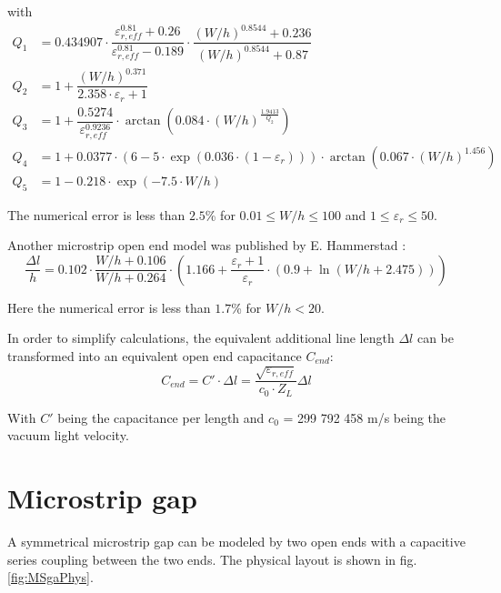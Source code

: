\documentclass[10pt]{report}
\begin{document}
with
\begin{align}
Q_1 &= 0.434907\cdot \dfrac{\varepsilon_{r,eff}^{0.81}+0.26}{\varepsilon_{r,eff}^{0.81}-0.189}\cdot
      \dfrac{\left( W/h \right)^{0.8544} + 0.236}{\left( W/h \right)^{0.8544} + 0.87}\\
Q_2 &= 1 + \dfrac{\left( W/h \right) ^{0.371}}{2.358\cdot \varepsilon_r + 1}\\
Q_3 &= 1 + \dfrac{0.5274}{\varepsilon_{r,eff}^{0.9236}} \cdot
      \arctan\left( 0.084\cdot\left( W/h \right) ^{\tfrac{1.9413}{Q_2}} \right)\\
Q_4 &= 1 + 0.0377\cdot \left( 6-5\cdot\exp{\left(0.036\cdot\left(1-\varepsilon_r\right)\right)} \right)\cdot
      \arctan\left( 0.067\cdot\left(W/h\right)^{1.456} \right)\\
Q_5 &= 1 - 0.218\cdot \exp{\left( -7.5\cdot W/h \right)}
\end{align}

The numerical error is less than $2.5$\% for $0.01\le W/h \le 100$ and
$1\le\varepsilon_r\le 50$.

\addvspace{12pt}

Another microstrip open end model was published by E. Hammerstad
\cite{Hammerstad2}:
\begin{equation}
\dfrac{\Delta l}{h} = 0.102\cdot \dfrac{W/h+0.106}{W/h+0.264} \cdot
    \left( 1.166 + \dfrac{\varepsilon_r+1}{\varepsilon_r}\cdot \left(0.9+\ln{\left(W/h+2.475\right)} \right) \right)
\end{equation}

Here the numerical error is less than $1.7$\% for $W/h < 20$.

\addvspace{12pt}

In order to simplify calculations, the equivalent additional line
length $\Delta l$ can be transformed into an equivalent open end
capacitance $C_{end}$:
\begin{equation}
\label{eq:Cend}
C_{end} = C'\cdot \Delta l = \dfrac{\sqrt{\varepsilon_{r,eff}}}{c_0\cdot Z_L} \Delta l
\end{equation}

With $C'$ being the capacitance per length and $c_0$ = 299 792 458 m/s
being the vacuum light velocity.

\section{Microstrip gap}

A symmetrical microstrip gap can be modeled by two open ends with a
capacitive series coupling between the two ends.  The physical layout
is shown in fig. \ref{fig:MSgaPhys}.
\end{document}
